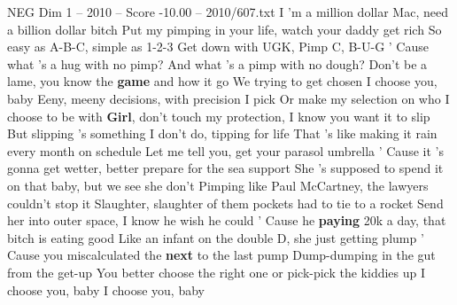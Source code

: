 \begin{textsample}{NEG Dim 1 – 2010 – Score -10.00 – 2010/607.txt}
I 'm a million dollar Mac, need a billion dollar bitch Put my pimping in your life, watch your daddy get rich So easy as A-B-C, simple as 1-2-3 Get down with UGK, Pimp C, B-U-G ' Cause what 's a hug with no pimp?
And what 's a pimp with no dough?
Don't be a lame, you know the \textbf{game} and how it go We trying to get chosen I choose you, baby Eeny, meeny decisions, with precision I pick Or make my selection on who I choose to be with \textbf{Girl}, don't touch my protection, I know you want it to slip But slipping 's something I don't do, tipping for life That 's like making it rain every month on schedule Let me tell you, get your parasol umbrella ' Cause it 's gonna get wetter, better prepare for the sea support She 's supposed to spend it on that baby, but we see she don't Pimping like Paul McCartney, the lawyers couldn't stop it Slaughter, slaughter of them pockets had to tie to a rocket Send her into outer space, I know he wish he could ' Cause he \textbf{paying} 20k a day, that bitch is eating good Like an infant on the double D, she just getting plump ' Cause you miscalculated the \textbf{next} to the last pump Dump-dumping in the gut from the get-up You better choose the right one or pick-pick the kiddies up I choose you, baby I choose you, baby

\end{textsample}
